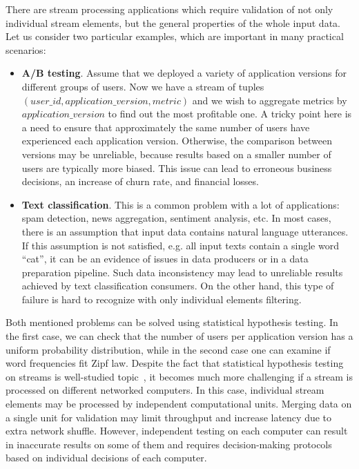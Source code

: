 \label {fs-short-intro}

There are stream processing applications which require validation of not only individual stream elements, but the general properties of the whole input data. Let us consider two particular examples, which are important in many practical scenarios:

\begin{itemize}
    \item {\bf A/B testing}. Assume that we deployed a variety of application versions for different groups of users. Now we have a stream of tuples $(user\_id,application\_version,metric)$ and we wish to aggregate metrics by $application\_version$ to find out the most profitable one. A tricky point here is a need to ensure that approximately the same number of users have experienced each application version. Otherwise, the comparison between versions may be unreliable, because results based on a smaller number of users are typically more biased. This issue can lead to erroneous business decisions, an increase of churn rate, and financial losses.
    \item {\bf Text classification}. This is a common problem with a lot of applications: spam detection, news aggregation, sentiment analysis, etc. In most cases, there is an assumption that input data contains natural language utterances. If this assumption is not satisfied, e.g. all input texts contain a single word ``cat'', it can be an evidence of issues in data producers or in a data preparation pipeline. Such data inconsistency may lead to unreliable results achieved by text classification consumers. On the other hand, this type of failure is hard to recognize with only individual elements filtering. 
\end{itemize}

Both mentioned problems can be solved using statistical hypothesis testing. In the first case, we can check that the number of users per application version has a uniform probability distribution, while in the second case one can examine if word frequencies fit Zipf law. Despite the fact that statistical hypothesis testing on streams is well-studied topic~\cite{???}, it becomes much more challenging if a stream is processed on different networked computers. In this case, individual stream elements may be processed by independent computational units. Merging data on a single unit for validation may limit throughput and increase latency due to extra network shuffle. However, independent testing on each computer can result in inaccurate results on some of them and requires decision-making protocols based on individual decisions of each computer.

